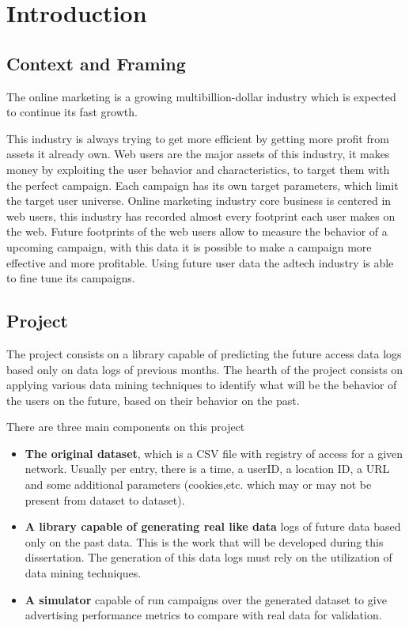 \chapter{Introduction} \label{chap:intro}


\section{Context and Framing} \label{sec:context}

The online marketing is a growing multibillion-dollar industry \cite{PricewaterhouseCoopers2013}
which is expected to continue its fast growth.\cite{PricewaterhouseCoopers2013a}

This industry is always trying to get more efficient by getting more profit from assets it already own. 
Web users are the major assets of this industry, it makes money by exploiting the user behavior and characteristics, to target them with the
perfect campaign. Each campaign has its own target parameters, which limit the target user universe.
Online marketing industry core business is centered in web users, this industry has recorded almost every footprint each user makes on the web.
Future footprints of the web users allow to measure the behavior of a upcoming campaign, with this data it is possible to make a campaign more
effective and more profitable. Using future user data the adtech industry is able to fine tune its campaigns. 

\section{Project} \label{sec:proj}

The project consists on a library capable of predicting the future access data logs based only on data logs of previous months.
The hearth of the project consists on applying various data mining techniques to identify what will be the behavior of the users on the future,
based on their behavior on the past.

There are three main components on this project
\begin{itemize}
\item \textbf{The original dataset}, which is a CSV file with registry of access for a given network. Usually per entry, there is 
  a time, a userID, a location ID, a URL and some additional parameters (cookies,etc. which may or may not be present from dataset to dataset).
\item \textbf{A library capable of generating real like data} logs of future data based only on the past data. This is the work that will be developed during
  this dissertation. The generation of this data logs must rely on the utilization of data mining techniques.
\item \textbf{A simulator} capable of run campaigns over the generated dataset to give advertising performance metrics to compare with real data for validation.
\end{itemize}

